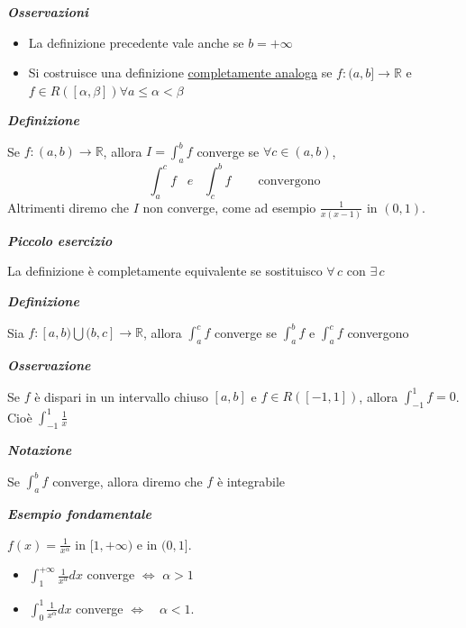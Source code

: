 \documentclass{article}
\theoremstyle{definition}
\newcommand{\R}{\mathbb{R}}
\begin{document}
    \begin{center}
        \textbf{\textit{Osservazioni}}
    \end{center}
\begin{itemize}
    \item La definizione precedente vale anche se $b=+\infty$
    \item Si costruisce una definizione \underline{completamente analoga} se $f:(a,b] \to \R$ e $f \in R([\alpha, \beta]) \forall a \leqslant \alpha < \beta$
\end{itemize}

\begin{center}
    \textbf{\textit{Definizione}}
\end{center}
Se $f:(a,b) \to \R$, allora $I=\int_a^b f$ converge se $\forall c \in (a,b)$,
\begin{equation*}
    \int_a^cf \,\,\,\,\, e \,\,\,\,\, \int_c^b f \,\,\,\,\,\,\,\,\,\,\,\,\, \mbox{convergono}
\end{equation*}
Altrimenti diremo che $I$ non converge, come ad esempio $\frac{1}{x(x-1)}$ in $(0,1)$.
\\
\begin{center}
    \textbf{\textit{Piccolo esercizio}}
\end{center}
La definizione è completamente equivalente se sostituisco $\forall \, c$ con $\exists \, c$
\begin{center}
  \textbf{\textit{Definizione}}
\end{center}
  Sia $f:[a,b) \bigcup (b,c] \to \R$, allora $\int_a^c f$ converge se $\int_a^b f$ e $\int_a^c f$ convergono

\begin{center}
    \textbf{\textit{Osservazione}}
\end{center}
Se $f$ è dispari in un intervallo chiuso $[a,b]$ e $f \in R([-1,1])$, allora $\int_{-1}^1 f =0$.
\\
Cioè $\int_{-1}^1 \frac{1}{x}$

\begin{center}
    \textbf{\textit{Notazione}}
\end{center}
Se $\int_a^b f $ converge, allora diremo che $f$ è integrabile
\begin{center}
    \textbf{\textit{Esempio fondamentale}}
\end{center}
$f(x)=\frac{1}{x^\alpha}$ in $[1,+\infty)$ e in $(0,1]$.
\\
\begin{itemize}
    \item $\int_1^{+\infty} \frac{1}{x^\alpha} dx$ converge $\Longleftrightarrow \,\, \alpha > 1$
    \item $\int_0^1 \frac{1}{x^\alpha}dx$ converge $\Longleftrightarrow $ \,\, $\alpha < 1$.
\end{itemize}
\end{document}
